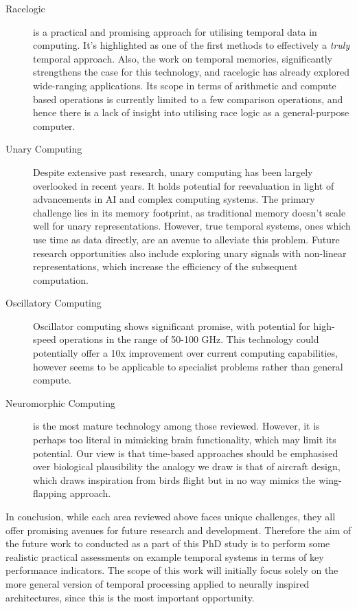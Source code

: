 \documentclass{article}
\begin{document}
\begin{description}

	\item[Racelogic] is a practical and promising approach for utilising temporal data in computing. It's highlighted as one of the first methods to effectively a \textit{truly} temporal approach. Also, the work on temporal memories, significantly strengthens the case for this technology, and racelogic has already explored wide-ranging applications. Its scope in terms of arithmetic and compute based operations is currently limited to a few comparison operations, and hence there is a lack of insight into utilising race logic as a general-purpose computer.

	\item[Unary Computing] Despite extensive past research, unary computing has been largely overlooked in recent years. It holds potential for reevaluation in light of advancements in AI and complex computing systems. The primary challenge lies in its memory footprint, as traditional memory doesn't scale well for unary representations. However, true temporal systems, ones which use time as data directly, are an avenue to alleviate this problem. Future research opportunities also include exploring unary signals with non-linear representations, which increase the efficiency of the subsequent computation.

	\item[Oscillatory Computing] Oscillator computing shows significant promise, with potential for high-speed operations in the range of 50-100 GHz. This technology could potentially offer a 10x improvement over current computing capabilities, however seems to be applicable to specialist problems rather than general compute.

	\item[Neuromorphic Computing] is the most mature technology among those reviewed. However, it is perhaps too literal in mimicking brain functionality, which may limit its potential. Our view is that time-based approaches should be emphasised over biological plausibility the analogy we draw is that of aircraft design, which draws inspiration from birds flight but in no way mimics the wing-flapping approach.
\end{description}

In conclusion, while each area reviewed above faces unique challenges, they all offer promising avenues for future research and development. Therefore the aim of the future work to conducted as a part of this PhD study is to perform some realistic practical assessments on example temporal systems in terms of key performance indicators. The scope of this work will initially focus solely on the more general version of temporal processing applied to neurally inspired architectures, since this is the most important opportunity.
\end{document}
